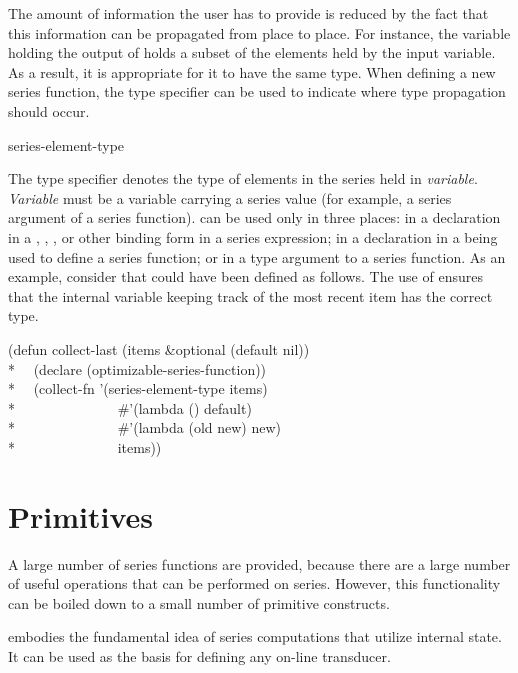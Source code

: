 The amount of information the user has to provide is reduced by the fact
that this information can be propagated from place to place.  For instance,
the variable holding the output of  holds a subset of the
elements held by the input variable.  As a result, it is appropriate for it
to have the same type.  When defining a new series function, the type
specifier  can be used to indicate where type
propagation should occur.

\begin{defun}
series-element-type

The type specifier  denotes the
type of elements in the series held in \emph{variable}.  \emph{Variable} must
be a variable carrying a series value (for example, a series argument of a series
function).   can be used only in three places: in
a declaration in a , , , or other
binding form in a series expression; in a declaration in a 
being used to define a series function; or in a type argument to a series
function.  As an example, consider that  could have been
defined as follows.  The use of  ensures that the
internal variable keeping track of the most recent item has the correct
type.
\begin{lisp}
(defun collect-last (items \&optional (default nil)) \\*
~~(declare (optimizable-series-function)) \\*
~~(collect-fn '(series-element-type items) \\*
~~~~~~~~~~~~~~\#'(lambda () default) \\*
~~~~~~~~~~~~~~\#'(lambda (old new) new) \\*
~~~~~~~~~~~~~~items))
\end{lisp}
\end{defun}

\section{Primitives}

A large number of series functions are provided, because there are a
large number of useful operations that can be performed on series.
However, this functionality can be boiled down to a small
number of primitive constructs.

 embodies the fundamental idea of series computations
that utilize internal state.  It can be used as the basis for defining any
on-line transducer.

